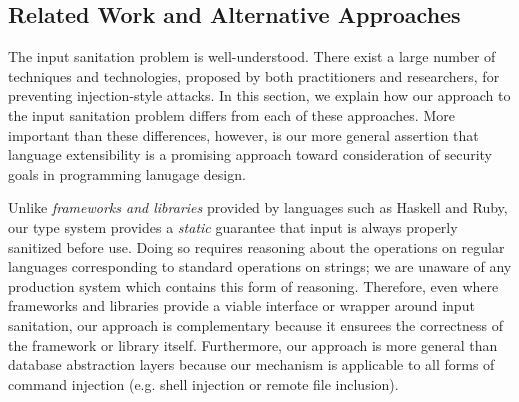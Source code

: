 \documentclass{acm_proc_article-sp}
\theoremstyle{definition}
\begin{document}
%


\subsection{Related Work and Alternative Approaches}

The input sanitation problem is well-understood. There exist a large number of techniques and technologies, proposed by both practitioners and researchers, for preventing injection-style attacks. In this section, we explain how our approach to the input sanitation problem differs from each of these approaches. More important than these differences, however, is our more general assertion that language extensibility is a promising approach toward consideration of security goals in programming lanugage design.

Unlike \emph{frameworks and libraries} provided by languages such as Haskell and Ruby, our type system provides a \emph{static} guarantee that input is always properly sanitized before use. Doing so requires reasoning about the operations on regular languages corresponding to standard operations on strings; we are unaware of any production system which contains this form of reasoning. Therefore, even where frameworks and libraries provide a viable interface or wrapper around input sanitation, our approach is complementary because it ensurees the correctness of the framework or library itself. Furthermore, our approach is more general than database abstraction layers because our mechanism is applicable to all forms of command injection (e.g. shell injection or remote file inclusion).
\end{document}
